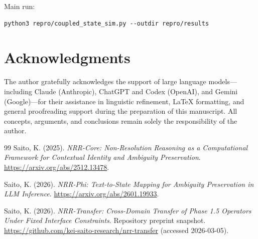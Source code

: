 \documentclass[11pt,a4paper]{article}
\begin{document}
Main run:
\begin{lstlisting}
python3 repro/coupled_state_sim.py --outdir repro/results
\end{lstlisting}

\section*{Acknowledgments}

The author gratefully acknowledges the support of large language
models---including Claude (Anthropic), ChatGPT and Codex (OpenAI), and Gemini (Google)---for their assistance in linguistic refinement,
LaTeX formatting, and general proofreading support during the
preparation of this manuscript.
All concepts, arguments, and conclusions remain solely the
responsibility of the author.

\begin{thebibliography}{99}
Saito, K. (2025).
\textit{NRR-Core: Non-Resolution Reasoning as a Computational Framework for Contextual Identity and Ambiguity Preservation}.
\url{https://arxiv.org/abs/2512.13478}.

Saito, K. (2026).
\textit{NRR-Phi: Text-to-State Mapping for Ambiguity Preservation in LLM Inference}.
\url{https://arxiv.org/abs/2601.19933}.

Saito, K. (2026).
\textit{NRR-Transfer: Cross-Domain Transfer of Phase 1.5 Operators Under Fixed Interface Constraints}.
Repository preprint snapshot. \url{https://github.com/kei-saito-research/nrr-transfer} (accessed 2026-03-05).
\end{thebibliography}
\end{document}
